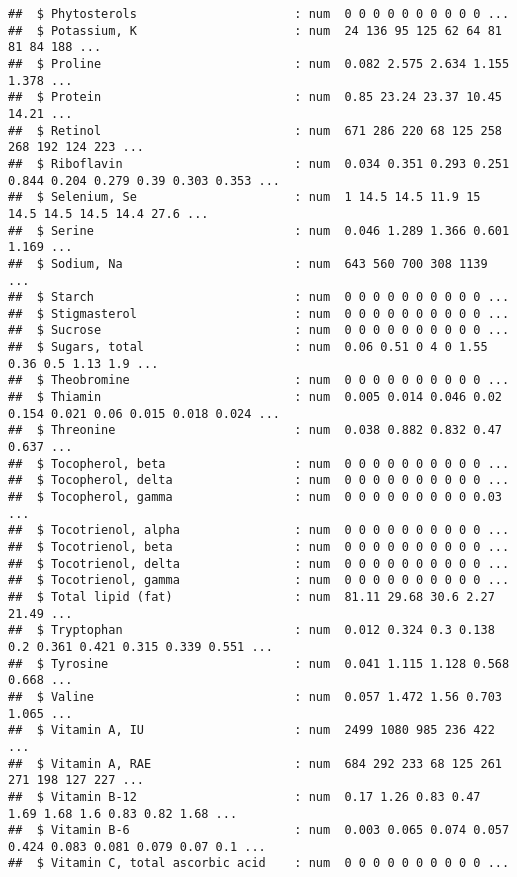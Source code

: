 \documentclass[]{article}
\begin{document}
\begin{verbatim}
##  $ Phytosterols                      : num  0 0 0 0 0 0 0 0 0 0 ...
##  $ Potassium, K                      : num  24 136 95 125 62 64 81 81 84 188 ...
##  $ Proline                           : num  0.082 2.575 2.634 1.155 1.378 ...
##  $ Protein                           : num  0.85 23.24 23.37 10.45 14.21 ...
##  $ Retinol                           : num  671 286 220 68 125 258 268 192 124 223 ...
##  $ Riboflavin                        : num  0.034 0.351 0.293 0.251 0.844 0.204 0.279 0.39 0.303 0.353 ...
##  $ Selenium, Se                      : num  1 14.5 14.5 11.9 15 14.5 14.5 14.5 14.4 27.6 ...
##  $ Serine                            : num  0.046 1.289 1.366 0.601 1.169 ...
##  $ Sodium, Na                        : num  643 560 700 308 1139 ...
##  $ Starch                            : num  0 0 0 0 0 0 0 0 0 0 ...
##  $ Stigmasterol                      : num  0 0 0 0 0 0 0 0 0 0 ...
##  $ Sucrose                           : num  0 0 0 0 0 0 0 0 0 0 ...
##  $ Sugars, total                     : num  0.06 0.51 0 4 0 1.55 0.36 0.5 1.13 1.9 ...
##  $ Theobromine                       : num  0 0 0 0 0 0 0 0 0 0 ...
##  $ Thiamin                           : num  0.005 0.014 0.046 0.02 0.154 0.021 0.06 0.015 0.018 0.024 ...
##  $ Threonine                         : num  0.038 0.882 0.832 0.47 0.637 ...
##  $ Tocopherol, beta                  : num  0 0 0 0 0 0 0 0 0 0 ...
##  $ Tocopherol, delta                 : num  0 0 0 0 0 0 0 0 0 0 ...
##  $ Tocopherol, gamma                 : num  0 0 0 0 0 0 0 0 0 0.03 ...
##  $ Tocotrienol, alpha                : num  0 0 0 0 0 0 0 0 0 0 ...
##  $ Tocotrienol, beta                 : num  0 0 0 0 0 0 0 0 0 0 ...
##  $ Tocotrienol, delta                : num  0 0 0 0 0 0 0 0 0 0 ...
##  $ Tocotrienol, gamma                : num  0 0 0 0 0 0 0 0 0 0 ...
##  $ Total lipid (fat)                 : num  81.11 29.68 30.6 2.27 21.49 ...
##  $ Tryptophan                        : num  0.012 0.324 0.3 0.138 0.2 0.361 0.421 0.315 0.339 0.551 ...
##  $ Tyrosine                          : num  0.041 1.115 1.128 0.568 0.668 ...
##  $ Valine                            : num  0.057 1.472 1.56 0.703 1.065 ...
##  $ Vitamin A, IU                     : num  2499 1080 985 236 422 ...
##  $ Vitamin A, RAE                    : num  684 292 233 68 125 261 271 198 127 227 ...
##  $ Vitamin B-12                      : num  0.17 1.26 0.83 0.47 1.69 1.68 1.6 0.83 0.82 1.68 ...
##  $ Vitamin B-6                       : num  0.003 0.065 0.074 0.057 0.424 0.083 0.081 0.079 0.07 0.1 ...
##  $ Vitamin C, total ascorbic acid    : num  0 0 0 0 0 0 0 0 0 0 ...

\end{verbatim}
\end{document}
